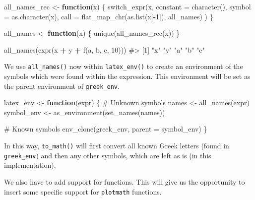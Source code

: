 \documentclass[
]{krantz}
\makeatletter
\newenvironment{Shaded}{\begin{snugshade}}{\end{snugshade}}
\newcommand{\CommentTok}[1]{\textcolor[rgb]{0.56,0.35,0.01}{\textit{#1}}}
\newcommand{\ControlFlowTok}[1]{\textcolor[rgb]{0.13,0.29,0.53}{\textbf{#1}}}
\newcommand{\DataTypeTok}[1]{\textcolor[rgb]{0.13,0.29,0.53}{#1}}
\newcommand{\DecValTok}[1]{\textcolor[rgb]{0.00,0.00,0.81}{#1}}
\newcommand{\KeywordTok}[1]{\textcolor[rgb]{0.13,0.29,0.53}{\textbf{#1}}}
\newcommand{\NormalTok}[1]{#1}
\newcommand{\OperatorTok}[1]{\textcolor[rgb]{0.81,0.36,0.00}{\textbf{#1}}}
\newcommand{\StringTok}[1]{\textcolor[rgb]{0.31,0.60,0.02}{#1}}
\newenvironment{kframe}{%
\medskip{}
\setlength{\fboxsep}{.8em}
 \def\at@end@of@kframe{}%
 \ifinner\ifhmode%
  \def\at@end@of@kframe{\end{minipage}}%
  \begin{minipage}{\columnwidth}%
 \fi\fi%
 \def\FrameCommand##1{\hskip\@totalleftmargin \hskip-\fboxsep
 \colorbox{shadecolor}{##1}\hskip-\fboxsep
     \hskip-\linewidth \hskip-\@totalleftmargin \hskip\columnwidth}%
 \MakeFramed {\advance\hsize-\width
   \@totalleftmargin\z@ \linewidth\hsize
   \@setminipage}}%
 {\par\unskip\endMakeFramed%
 \at@end@of@kframe}
\renewenvironment{Shaded}{\begin{kframe}}{\end{kframe}}
\renewcommand{\KeywordTok} [1]{\textcolor[rgb]{0.00,0.44,0.13}{{#1}}}
\renewcommand{\DataTypeTok}[1]{\textcolor[rgb]{0.56,0.13,0.00}{{#1}}}
\renewcommand{\DecValTok}  [1]{\textcolor[rgb]{0.25,0.63,0.44}{{#1}}}
\renewcommand{\StringTok}  [1]{\textcolor[rgb]{0.25,0.44,0.63}{{#1}}}
\renewcommand{\CommentTok} [1]{\textcolor[rgb]{0.38,0.63,0.69}{{#1}}}
\renewcommand{\NormalTok}  [1]{{#1}}
\makeatother
\begin{document}
\begin{Shaded}
\begin{Highlighting}[]
\NormalTok{all_names_rec <-}\StringTok{ }\ControlFlowTok{function}\NormalTok{(x) \{}
  \KeywordTok{switch_expr}\NormalTok{(x,}
              \DataTypeTok{constant =} \KeywordTok{character}\NormalTok{(),}
              \DataTypeTok{symbol =}   \KeywordTok{as.character}\NormalTok{(x),}
              \DataTypeTok{call =}     \KeywordTok{flat_map_chr}\NormalTok{(}\KeywordTok{as.list}\NormalTok{(x[}\OperatorTok{-}\DecValTok{1}\NormalTok{]), all_names)}
\NormalTok{  )}
\NormalTok{\}}

\NormalTok{all_names <-}\StringTok{ }\ControlFlowTok{function}\NormalTok{(x) \{}
  \KeywordTok{unique}\NormalTok{(}\KeywordTok{all_names_rec}\NormalTok{(x))}
\NormalTok{\}}

\KeywordTok{all_names}\NormalTok{(}\KeywordTok{expr}\NormalTok{(x }\OperatorTok{+}\StringTok{ }\NormalTok{y }\OperatorTok{+}\StringTok{ }\KeywordTok{f}\NormalTok{(a, b, c, }\DecValTok{10}\NormalTok{)))}
\CommentTok{#> [1] "x" "y" "a" "b" "c"}
\end{Highlighting}
\end{Shaded}

We use \texttt{all\_names()} now within \texttt{latex\_env()} to create an environment of the symbols which were found within the expression. This environment will be set as the parent environment of \texttt{greek\_env}.

\begin{Shaded}
\begin{Highlighting}[]
\NormalTok{latex_env <-}\StringTok{ }\ControlFlowTok{function}\NormalTok{(expr) \{}
  \CommentTok{# Unknown symbols}
\NormalTok{  names <-}\StringTok{ }\KeywordTok{all_names}\NormalTok{(expr)}
\NormalTok{  symbol_env <-}\StringTok{ }\KeywordTok{as_environment}\NormalTok{(}\KeywordTok{set_names}\NormalTok{(names))}
  
  \CommentTok{# Known symbols}
  \KeywordTok{env_clone}\NormalTok{(greek_env, }\DataTypeTok{parent =}\NormalTok{ symbol_env)}
\NormalTok{\}}
\end{Highlighting}
\end{Shaded}

In this way, \texttt{to\_math()} will first convert all known Greek letters (found in \texttt{greek\_env}) and then any other symbols, which are left as is (in this implementation).

We also have to add support for functions. This will give us the opportunity to insert some specific support for \texttt{plotmath} functions.
\end{document}
